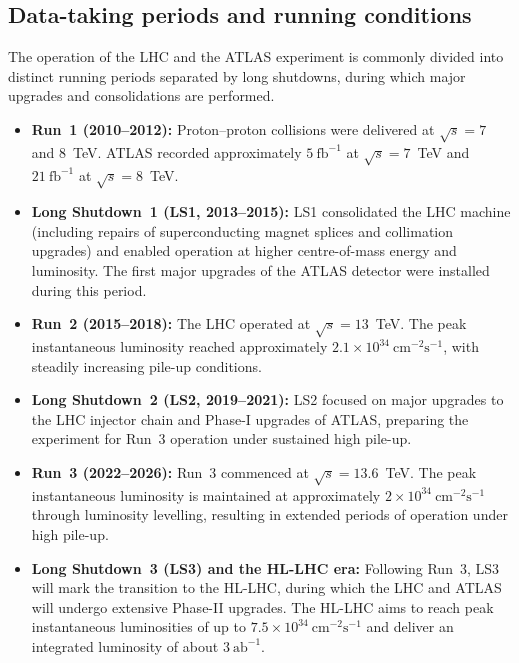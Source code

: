 \subsection{Data-taking periods and running conditions}
\label{LHC_conditions}

The operation of the LHC and the ATLAS experiment is commonly divided into distinct running periods separated by long shutdowns, during which major upgrades and consolidations are performed.

\begin{itemize}
  \item \textbf{Run~1 (2010--2012):}  
  Proton--proton collisions were delivered at $\sqrt{s}=7$ and $8$~TeV.
  ATLAS recorded approximately $5~\mathrm{fb}^{-1}$ at $\sqrt{s}=7$~TeV and $21~\mathrm{fb}^{-1}$ at $\sqrt{s}=8$~TeV.

  \item \textbf{Long Shutdown~1 (LS1, 2013--2015):}  
  LS1 consolidated the LHC machine (including repairs of superconducting magnet splices and collimation upgrades) and enabled operation at higher centre-of-mass energy and luminosity.
  The first major upgrades of the ATLAS detector were installed during this period.

  \item \textbf{Run~2 (2015--2018):}  
  The LHC operated at $\sqrt{s}=13$~TeV.
  The peak instantaneous luminosity reached approximately $2.1 \times 10^{34}~\mathrm{cm}^{-2}\mathrm{s}^{-1}$, with steadily increasing pile-up conditions.

  \item \textbf{Long Shutdown~2 (LS2, 2019--2021):}  
  LS2 focused on major upgrades to the LHC injector chain and Phase-I upgrades of ATLAS, preparing the experiment for Run~3 operation under sustained high pile-up.

  \item \textbf{Run~3 (2022--2026):}  
  Run~3 commenced at $\sqrt{s}=13.6$~TeV.
  The peak instantaneous luminosity is maintained at approximately $2 \times 10^{34}~\mathrm{cm}^{-2}\mathrm{s}^{-1}$ through luminosity levelling, resulting in extended periods of operation under high pile-up.

  \item \textbf{Long Shutdown~3 (LS3) and the HL-LHC era:}  
  Following Run~3, LS3 will mark the transition to the HL-LHC, during which the LHC and ATLAS will undergo extensive Phase-II upgrades.
  The HL-LHC aims to reach peak instantaneous luminosities of up to $7.5 \times 10^{34}~\mathrm{cm}^{-2}\mathrm{s}^{-1}$ and deliver an integrated luminosity of about $3~\mathrm{ab}^{-1}$.
\end{itemize}

